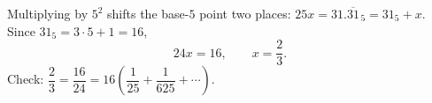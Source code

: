 Multiplying by $5^2$ shifts the base-$5$ point two places: $25x=31.\overline{31}_{\,5}=31_5+x$. Since $31_5=3\cdot5+1=16$,
\[
24x=16,\qquad x=\boxed{\dfrac{2}{3}}.
\]
Check: $\dfrac{2}{3}=\dfrac{16}{24}=16\left(\dfrac{1}{25}+\dfrac{1}{625}+\cdots\right)$.
